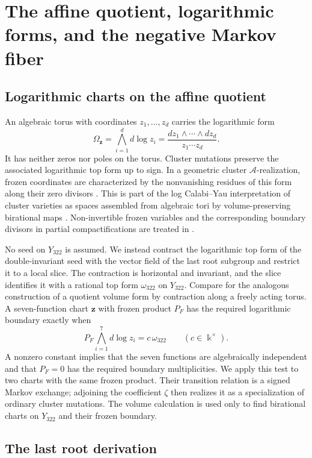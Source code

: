 \documentclass[11pt,reqno]{amsart}
\numberwithin{equation}{section}
\theoremstyle{remark}
\newcommand{\kk}{\Bbbk}
\begin{document}
\section{The affine quotient, logarithmic forms, and the negative Markov fiber}
\label{sec:slice-volume}

\subsection{Logarithmic charts on the affine quotient}

An algebraic torus with coordinates $z_1,\ldots,z_d$ carries the
logarithmic form
\[ \Omega_{\mathbf z}=\bigwedge_{i=1}^d d\!\log z_i =\frac{dz_1\wedge\cdots\wedge dz_d}{z_1\cdots z_d}. \]
It has neither zeros nor poles on the torus.  Cluster mutations preserve the
associated logarithmic top form up to sign.  In a geometric cluster
$\mathcal A$-realization, frozen coordinates are characterized by the
nonvanishing residues of this form along their zero divisors
\cite[Definition~11.2, Lemma~11.3, and Definition~11.5]{GS15}.  This is part
of the log Calabi--Yau interpretation of cluster varieties as spaces assembled
from algebraic tori by volume-preserving birational maps
\cite[\S1]{GHK15}.  Non-invertible frozen variables and the corresponding
boundary divisors in partial compactifications are treated in
\cite[\S2.2]{MandelCox}.

No seed on $Y_{322}$ is assumed.  We instead contract the logarithmic top
form of the double-invariant seed with the vector field of the last root
subgroup and restrict it to a local slice.  The contraction is horizontal and
invariant, and the slice identifies it with a rational top form
$\omega_{322}$ on $Y_{322}$.  Compare \cite[\S1.4]{GS15} for the analogous
construction of a quotient volume form by contraction along a freely acting
torus.  A seven-function chart $\mathbf z$ with
frozen product $P_F$ has the required logarithmic boundary exactly when
\[ P_F\bigwedge_{i=1}^7 d\!\log z_i=c\,\omega_{322} \qquad(c\in\kk^\times). \]
A nonzero constant implies that the seven functions are algebraically
independent and that $P_F=0$ has the required boundary multiplicities.  We
apply this test to two charts with the same frozen product.  Their transition
relation is a signed Markov exchange; adjoining the coefficient $\zeta$
then realizes it as a specialization of ordinary cluster mutations.  The
volume calculation is used only to find birational charts on $Y_{322}$ and
their frozen boundary.

\subsection{The last root derivation}
\end{document}
